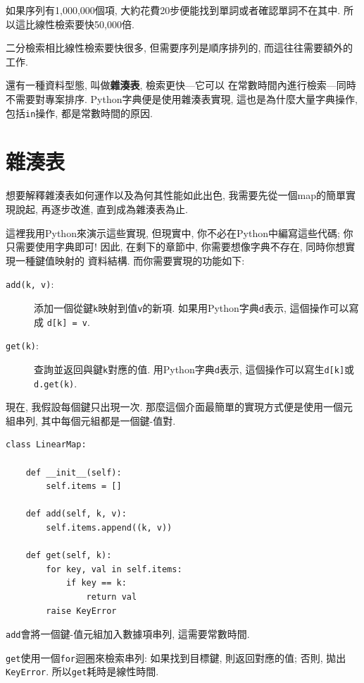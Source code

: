 \documentclass[10pt]{book}
\begin{document}
如果序列有1,000,000個項, 大約花費20步便能找到單詞或者確認單詞不在其中. 
所以這比線性檢索要快50,000倍. 

二分檢索相比線性檢索要快很多, 但需要序列是順序排列的, 
而這往往需要額外的工作. 

還有一種資料型態, 叫做{\bf 雜湊表}, 檢索更快---它可以
在常數時間內進行檢索---同時不需要對專案排序. 
Python字典便是使用雜湊表實現, 這也是為什麼大量字典操作, 包括{\tt in}操作, 
都是常數時間的原因. 


\section{雜湊表}
\label{hashtable}

想要解釋雜湊表如何運作以及為何其性能如此出色, 
我需要先從一個map的簡單實現說起, 
再逐步改進, 直到成為雜湊表為止. 

這裡我用Python來演示這些實現, 但現實中, 你不必在Python中編寫這些代碼; 
你只需要使用字典即可!
因此, 在剩下的章節中, 你需要想像字典不存在, 同時你想實現一種鍵值映射的
資料結構. 而你需要實現的功能如下:

\begin{description}

\item[{\tt add(k, v)}:] 添加一個從鍵{\tt k}映射到值{\tt v}的新項.
如果用Python字典{\tt d}表示, 這個操作可以寫成 {\tt d[k] = v}.

\item[{\tt get(k)}:] 查詢並返回與鍵{\tt k}對應的值.
用Python字典{\tt d}表示, 這個操作可以寫生{\tt d[k]}或{\tt d.get(k)}.

\end{description}
現在, 我假設每個鍵只出現一次.
那麼這個介面最簡單的實現方式便是使用一個元組串列,
其中每個元組都是一個鍵-值對.

\begin{verbatim}
class LinearMap:

    def __init__(self):
        self.items = []

    def add(self, k, v):
        self.items.append((k, v))

    def get(self, k):
        for key, val in self.items:
            if key == k:
                return val
        raise KeyError
\end{verbatim}

{\tt add}會將一個鍵-值元組加入數據項串列, 這需要常數時間.

{\tt get}使用一個{\tt for}迴圈來檢索串列:
如果找到目標鍵, 則返回對應的值;
否則, 拋出{\tt KeyError}.
所以{\tt get}耗時是線性時間.
\end{document}
